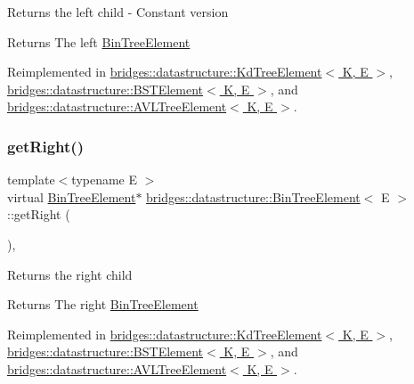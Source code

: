 Returns the left child -\/ Constant version \begin{DoxyReturn}{Returns}
The left \hyperlink{classbridges_1_1datastructure_1_1_bin_tree_element}{Bin\+Tree\+Element} 
\end{DoxyReturn}


Reimplemented in \hyperlink{classbridges_1_1datastructure_1_1_kd_tree_element_a653597918fbc6e31b84fcf8dbdf67122}{bridges\+::datastructure\+::\+Kd\+Tree\+Element$<$ K, E $>$}, \hyperlink{classbridges_1_1datastructure_1_1_b_s_t_element_abac324ef0b480420bd82ecfe4501d60d}{bridges\+::datastructure\+::\+B\+S\+T\+Element$<$ K, E $>$}, and \hyperlink{classbridges_1_1datastructure_1_1_a_v_l_tree_element_a4a639e0c623435aadf5c51ed132cb25d}{bridges\+::datastructure\+::\+A\+V\+L\+Tree\+Element$<$ K, E $>$}.

\mbox{\label{classbridges_1_1datastructure_1_1_bin_tree_element_ae1e6bde8cc03cf5da5a7930354fdf592}} 
\subsubsection{\texorpdfstring{get\+Right()}{getRight()}\hspace{0.1cm}{\footnotesize\ttfamily [1/2]}}
{\footnotesize\ttfamily template$<$typename E $>$ \\
virtual \hyperlink{classbridges_1_1datastructure_1_1_bin_tree_element}{Bin\+Tree\+Element}$\ast$ \hyperlink{classbridges_1_1datastructure_1_1_bin_tree_element}{bridges\+::datastructure\+::\+Bin\+Tree\+Element}$<$ E $>$\+::get\+Right (\begin{DoxyParamCaption}{ }\end{DoxyParamCaption})\hspace{0.3cm}{\ttfamily [inline]}, {\ttfamily [virtual]}}

Returns the right child \begin{DoxyReturn}{Returns}
The right \hyperlink{classbridges_1_1datastructure_1_1_bin_tree_element}{Bin\+Tree\+Element} 
\end{DoxyReturn}


Reimplemented in \hyperlink{classbridges_1_1datastructure_1_1_kd_tree_element_a366e3b0987169220d3a145043be2373d}{bridges\+::datastructure\+::\+Kd\+Tree\+Element$<$ K, E $>$}, \hyperlink{classbridges_1_1datastructure_1_1_b_s_t_element_a80f5085d6d03805dd3091b7693d8e235}{bridges\+::datastructure\+::\+B\+S\+T\+Element$<$ K, E $>$}, and \hyperlink{classbridges_1_1datastructure_1_1_a_v_l_tree_element_aed585fdf56fcbfebac6cd0262c9c1807}{bridges\+::datastructure\+::\+A\+V\+L\+Tree\+Element$<$ K, E $>$}.

